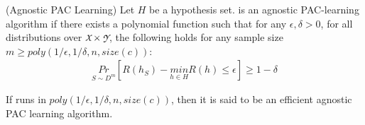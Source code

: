 \documentclass[../main]{subfiles}
\begin{document}
\begin{definition}(Agnostic PAC Learning) \label{def:agnostic_pac}
Let $H$ be a hypothesis set.  is an agnostic PAC-learning algorithm if there
exists a polynomial function such that for any $\epsilon, \delta > 0$, for all distributions
 over $\cursive{X} \times \cursive{Y}$, the following holds for any sample
size $m \geq poly(1/\epsilon,1/\delta,n,size(c))$:
\begin{align}
\underset{S \sim D^m}{Pr} \left[ R(h_S) - \underset{h \in H}{min} R(h) \leq \epsilon  \right] \geq 1-\delta
\end{align}

If  runs in $poly(1/\epsilon,1/\delta,n,size(c))$, then it is said to be an efficient
agnostic PAC learning algorithm.
\end{definition}
\end{document}
